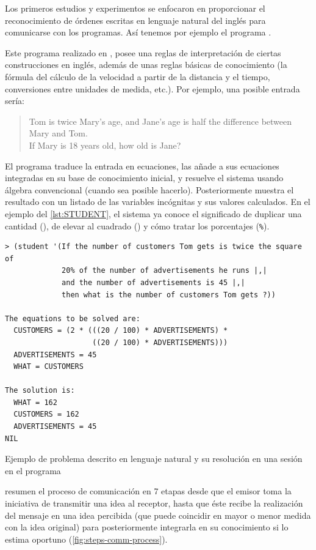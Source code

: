 Los primeros estudios y experimentos se enfocaron en proporcionar el reconocimiento de órdenes escritas en lenguaje natural del inglés para comunicarse con los programas. Así tenemos por ejemplo el programa  \citep{Bobrow1964}.

Este programa realizado en , posee una reglas de interpretación de ciertas construcciones en inglés, además de unas reglas básicas de conocimiento (la fórmula del cálculo de la velocidad a partir de la distancia y el tiempo, conversiones entre unidades de medida, etc.). Por ejemplo, una posible entrada sería:
\foreignblockquote{english}{Tom is twice Mary's age, and Jane's age is half the difference between \\
Mary and Tom.\\
If Mary is 18 years old, how old is Jane?}

El programa traduce la entrada en ecuaciones, las añade a sus ecuaciones integradas en su base de conocimiento inicial, y resuelve el sistema usando álgebra convencional (cuando sea posible hacerlo). Posteriormente muestra el resultado con un listado de las variables incógnitas y sus valores calculados. En el ejemplo del \autoref{lst:STUDENT}, el sistema ya conoce el significado de duplicar una cantidad (), de elevar al cuadrado () y cómo tratar los porcentajes (\verb=%=).

\begin{listing}[htbp]
\begin{verbatim}
> (student '(If the number of customers Tom gets is twice the square of
             20% of the number of advertisements he runs |,|
             and the number of advertisements is 45 |,|
             then what is the number of customers Tom gets ?))

The equations to be solved are:
  CUSTOMERS = (2 * (((20 / 100) * ADVERTISEMENTS) *
                    ((20 / 100) * ADVERTISEMENTS)))
  ADVERTISEMENTS = 45
  WHAT = CUSTOMERS

The solution is:
  WHAT = 162
  CUSTOMERS = 162
  ADVERTISEMENTS = 45
NIL
\end{verbatim}
\caption[Ejemplo de problema descrito en lenguaje natural y su resolución en ]{Ejemplo de problema descrito en lenguaje natural y su resolución en una sesión en el programa  \citep{Norvig2014}}
\label{lst:STUDENT}
\end{listing}

\citet{Russell2003} resumen el proceso de comunicación en 7 etapas desde que el emisor toma la iniciativa de transmitir una idea al receptor, hasta que éste recibe la realización del mensaje en una idea percibida (que puede coincidir en mayor o menor medida con la idea original) para posteriormente integrarla en su conocimiento si lo estima oportuno (\autoref{fig:steps-comm-process}).

